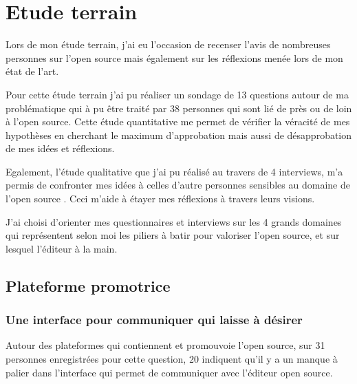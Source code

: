\chapter{Etude terrain} %

	Lors de mon étude terrain, j'ai eu l'occasion de recenser l'avis de nombreuses personnes sur l'open source mais également sur les réflexions menée lors de mon état de l'art.

	Pour cette étude terrain j'ai pu réaliser un sondage de 13 questions autour de ma problématique qui à pu être traité par 38 personnes qui sont lié de près ou de loin à l'open source. Cette étude quantitative me permet de vérifier la véracité de mes hypothèses en cherchant le maximum d'approbation mais aussi de désapprobation de mes idées et réflexions.

	Egalement, l'étude qualitative que j'ai pu réalisé au travers de 4 interviews, m'a permis de confronter mes idées à celles d'autre personnes sensibles au domaine de l'open source . Ceci m'aide à étayer mes réflexions à travers leurs visions.

	J'ai choisi d'orienter mes questionnaires et interviews sur les 4 grands domaines qui représentent selon moi les piliers à batir pour valoriser l'open source, et sur lesquel l'éditeur à la main.

	\section{Plateforme promotrice}

		\subsection{Une interface pour communiquer qui laisse à désirer}

			Autour des plateformes qui contiennent et promouvoie l'open source, sur 31 personnes enregistrées pour cette question, 20 indiquent qu'il y a un manque à palier dans l'interface qui permet de communiquer avec l'éditeur open source. 

